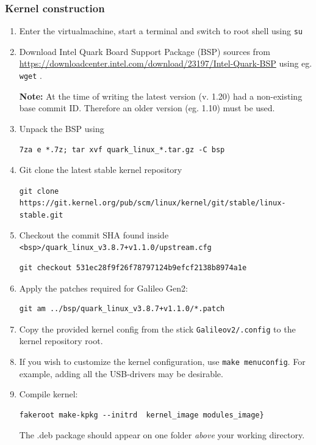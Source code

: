 \documentclass[a4paper,11pt]{article}
\newcommand{\note}{\textbf{Note: }}
\newcommand{\cmd}[1]{\texttt{#1}}
\begin{document}
\subsubsection*{Kernel construction}
\begin{enumerate}
\item Enter the virtualmachine, start a terminal and switch to root shell using \cmd{su}

\item Download Intel Quark Board Support Package (BSP) sources from  \url{https://downloadcenter.intel.com/download/23197/Intel-Quark-BSP} using eg. \cmd{wget} .

\note At the time of writing the latest version (v. 1.20) had a non-existing base commit ID. Therefore an older version (eg. 1.10) must be used.

\item Unpack the BSP using 
\begin{lstlisting}
7za e *.7z; tar xvf quark_linux_*.tar.gz -C bsp
\end{lstlisting}

\item Git clone the latest stable kernel repository 

\cmd {git clone https://git.kernel.org/pub/scm/linux/kernel/git/stable/linux-stable.git}

\item Checkout the commit SHA found inside \cmd{<bsp>/quark\_linux\_v3.8.7+v1.1.0/upstream.cfg}
\begin{lstlisting}
git checkout 531ec28f9f26f78797124b9efcf2138b8974a1e
\end{lstlisting}

\item Apply the patches required for Galileo Gen2: 
\begin{lstlisting}
git am ../bsp/quark_linux_v3.8.7+v1.1.0/*.patch
\end{lstlisting}

\item Copy the provided kernel config from the stick \cmd{Galileov2/.config} to the kernel repository root.

\item If you wish to customize the kernel configuration, use \cmd{make menuconfig}. For example, adding all the USB-drivers may be desirable.

\item Compile kernel: 
\begin{lstlisting}
fakeroot make-kpkg --initrd  kernel_image modules_image}
\end{lstlisting}  
The .deb package should appear on one folder \textit{above} your working directory.
\end{enumerate}
\end{document}
